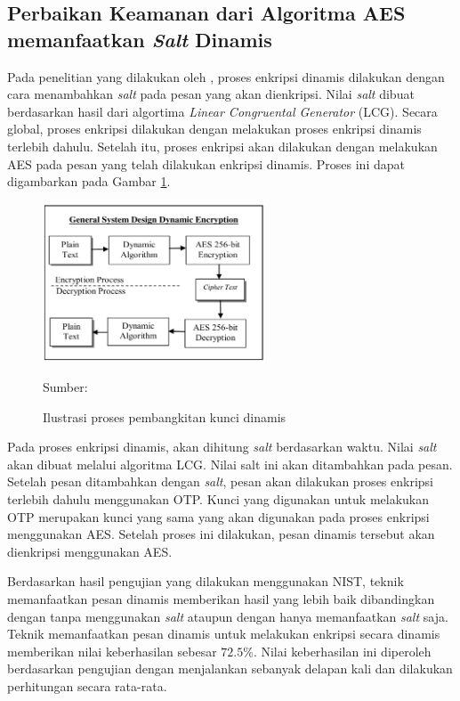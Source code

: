 \subsection{Perbaikan Keamanan dari Algoritma AES memanfaatkan \emph{Salt} Dinamis}
Pada penelitian yang dilakukan oleh \textcite{bachtiar2018}, proses enkripsi dinamis dilakukan dengan cara menambahkan \emph{salt} pada pesan yang akan dienkripsi. Nilai \emph{salt} dibuat berdasarkan hasil dari algortima \emph{Linear Congruental Generator} (LCG). Secara global, proses enkripsi dilakukan dengan melakukan proses enkripsi dinamis terlebih dahulu. Setelah itu, proses enkripsi akan dilakukan dengan melakukan AES pada pesan yang telah dilakukan enkripsi dinamis. Proses ini dapat digambarkan pada Gambar \ref{fig:bachtiar.enc.process}.

\begin{figure}[!h]
  \centering
  \includegraphics[width=250px]{chapters/res/chapter-2/img/bachtiar.enc.process.png}
  \caption{Ilustrasi proses pembangkitan kunci dinamis} \label{fig:bachtiar.enc.process}
  Sumber: \textcite{bachtiar2018}
\end{figure}

Pada proses enkripsi dinamis, akan dihitung \emph{salt} berdasarkan waktu. Nilai \emph{salt} akan dibuat melalui algoritma LCG.  Nilai salt ini akan ditambahkan pada pesan. Setelah pesan ditambahkan dengan \emph{salt}, pesan akan dilakukan proses enkripsi terlebih dahulu menggunakan OTP. Kunci yang digunakan untuk melakukan OTP merupakan kunci yang sama yang akan digunakan pada proses enkripsi menggunakan AES. Setelah proses ini dilakukan, pesan dinamis tersebut akan dienkripsi menggunakan AES.

Berdasarkan hasil pengujian yang dilakukan menggunakan NIST, teknik memanfaatkan pesan dinamis memberikan hasil yang lebih baik dibandingkan dengan tanpa menggunakan \emph{salt} ataupun dengan hanya memanfaatkan \emph{salt} saja. Teknik memanfaatkan pesan dinamis untuk melakukan enkripsi secara dinamis memberikan nilai keberhasilan sebesar $72.5\%$. Nilai keberhasilan ini diperoleh berdasarkan pengujian dengan menjalankan sebanyak delapan kali dan dilakukan perhitungan secara rata-rata.
